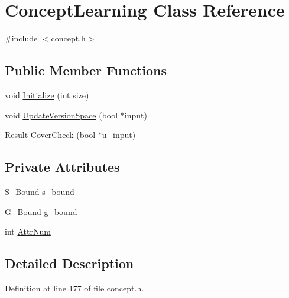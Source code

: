 \hypertarget{class_concept_learning}{\section{Concept\-Learning Class Reference}
\label{class_concept_learning}
}


{\ttfamily \#include $<$concept.\-h$>$}

\subsection*{Public Member Functions}
\begin{DoxyCompactItemize}
\item 
void \hyperlink{class_concept_learning_a44745c32a43e09ce1682efdbd29d01f2}{Initialize} (int size)
\item 
void \hyperlink{class_concept_learning_adcdb0df6a5e877769e46c95f40a139c3}{Update\-Version\-Space} (bool $\ast$input)
\item 
\hyperlink{concept_8h_a28287671eaf7406afd604bd055ba4066}{Result} \hyperlink{class_concept_learning_a2c918ff637b1d93e123974eaddd17de0}{Cover\-Check} (bool $\ast$u\-\_\-input)
\end{DoxyCompactItemize}
\subsection*{Private Attributes}
\begin{DoxyCompactItemize}
\item 
\hyperlink{class_s___bound}{S\-\_\-\-Bound} \hyperlink{class_concept_learning_a8ac1de9ab4694d91cffabda42443a96e}{s\-\_\-bound}
\item 
\hyperlink{class_g___bound}{G\-\_\-\-Bound} \hyperlink{class_concept_learning_a449a58ac04e18fd981b2e6bf984fd764}{g\-\_\-bound}
\item 
int \hyperlink{class_concept_learning_ae6bebaccc7f80436856e5ec539feb04c}{Attr\-Num}
\end{DoxyCompactItemize}


\subsection{Detailed Description}


Definition at line 177 of file concept.\-h.



